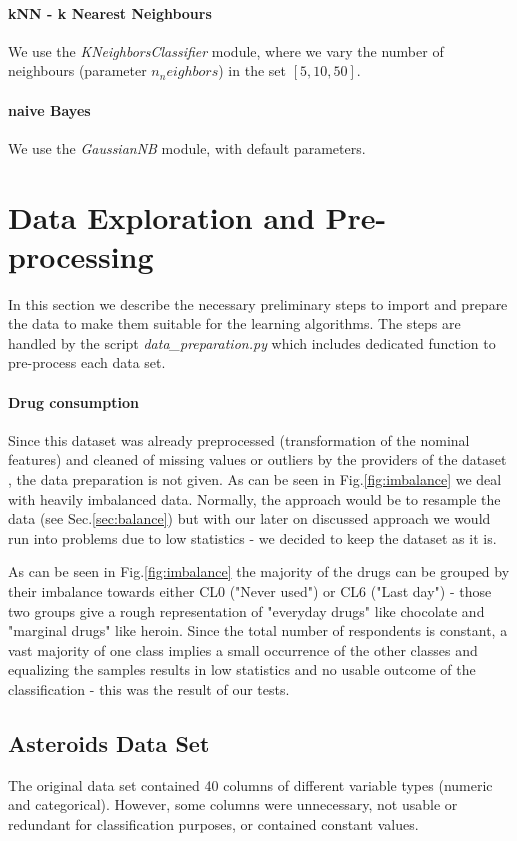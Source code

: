 \documentclass{article}
\begin{document}
\paragraph{kNN - k Nearest Neighbours} We use the \textit{KNeighborsClassifier} module, where we vary the number of neighbours (parameter $n_neighbors$) in the set $[5,10,50]$.

\paragraph{naive Bayes}  We use the \textit{GaussianNB} module, with default parameters.



\section{Data Exploration and Pre-processing}
In this section we describe the necessary preliminary steps to import and prepare the data to make them suitable for the learning algorithms.
The steps are handled by the script \textit{data\_preparation.py} which includes dedicated function to pre-process each data set.

\paragraph{Drug consumption}
Since this dataset was already preprocessed (transformation of the nominal features) and cleaned of missing values or outliers by the providers of the dataset \cite{fehrman2017factor}, the data preparation is not given. As can be seen in Fig.\ref{fig:imbalance} we deal with heavily imbalanced data. Normally, the approach would be to resample the data (see Sec.\ref{sec:balance}) but with our later on discussed approach we would run into problems due to low statistics - we decided to keep the dataset as it is.

As can be seen in Fig.\ref{fig:imbalance} the majority of the drugs can be grouped by their imbalance towards either CL0 ("Never used") or CL6 ("Last day") - those two groups give a rough representation of "everyday drugs" like chocolate and "marginal drugs" like heroin. Since the total number of respondents is constant, a vast majority of one class implies a small occurrence of the other classes and equalizing the samples results in low statistics and no usable outcome of the classification - this was the result of our tests. \\

\subsection{Asteroids Data Set}
The original data set contained 40 columns of different variable types (numeric and categorical). However, some columns were unnecessary, not usable or redundant for classification purposes, or contained constant values.
\end{document}
